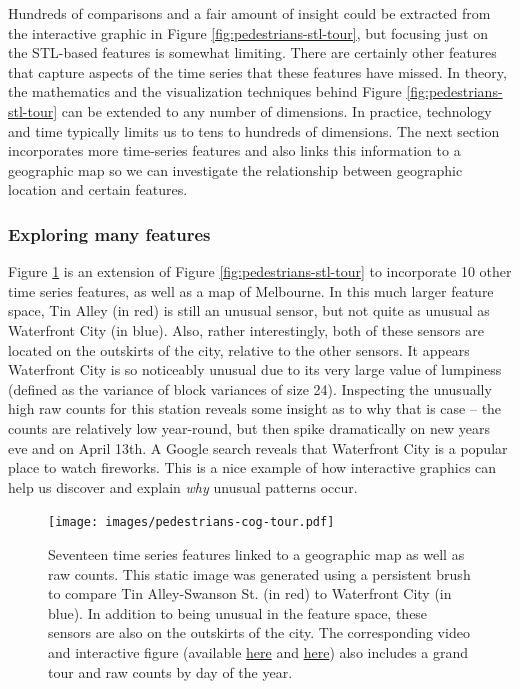 \documentclass[12pt,]{isuthesis}
\begin{document}
Hundreds of comparisons and a fair amount of insight could be extracted
from the interactive graphic in Figure \ref{fig:pedestrians-stl-tour},
but focusing just on the STL-based features is somewhat limiting. There
are certainly other features that capture aspects of the time series
that these features have missed. In theory, the mathematics and the
visualization techniques behind Figure \ref{fig:pedestrians-stl-tour}
can be extended to any number of dimensions. In practice, technology and
time typically limits us to tens to hundreds of dimensions. The next
section incorporates more time-series features and also links this
information to a geographic map so we can investigate the relationship
between geographic location and certain features.

\subsubsection{Exploring many features}\label{exploring-many-features}

Figure \ref{fig:pedestrians-cog-tour} is an extension of Figure
\ref{fig:pedestrians-stl-tour} to incorporate 10 other time series
features, as well as a map of Melbourne. In this much larger feature
space, Tin Alley (in red) is still an unusual sensor, but not quite as
unusual as Waterfront City (in blue). Also, rather interestingly, both
of these sensors are located on the outskirts of the city, relative to
the other sensors. It appears Waterfront City is so noticeably unusual
due to its very large value of lumpiness (defined as the variance of
block variances of size 24). Inspecting the unusually high raw counts
for this station reveals some insight as to why that is case -- the
counts are relatively low year-round, but then spike dramatically on new
years eve and on April 13th. A Google search reveals that Waterfront
City is a popular place to watch fireworks. This is a nice example of
how interactive graphics can help us discover and explain \emph{why}
unusual patterns occur.

\begin{figure}
\centering
\texttt{[image: images/pedestrians-cog-tour.pdf]}
\caption{\label{fig:pedestrians-cog-tour}Seventeen time series features
linked to a geographic map as well as raw counts. This static image was
generated using a persistent brush to compare Tin Alley-Swanson St. (in
red) to Waterfront City (in blue). In addition to being unusual in the
feature space, these sensors are also on the outskirts of the city. The
corresponding video and interactive figure (available
\href{https://vimeo.com/192710308}{here} and
\href{http://cpsievert.github.io/pedestrians/cog-tour/}{here}) also
includes a grand tour and raw counts by day of the year.}
\end{figure}
\end{document}
